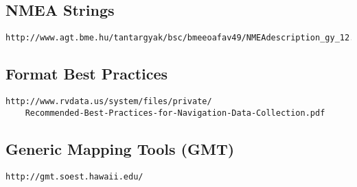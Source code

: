 \documentclass{article}
\begin{document}
		\subsection{NMEA Strings}
		\label{nmea_spec}
		
\begin{lstlisting}
http://www.agt.bme.hu/tantargyak/bsc/bmeeoafav49/NMEAdescription_gy_12.pdf
\end{lstlisting}
		
		\subsection{Format Best Practices}
		\label{best_practices}
		
\begin{lstlisting}
http://www.rvdata.us/system/files/private/
	Recommended-Best-Practices-for-Navigation-Data-Collection.pdf
\end{lstlisting}

		\subsection{Generic Mapping Tools (GMT)}
		\label{GMT}
		
\begin{lstlisting}
http://gmt.soest.hawaii.edu/
\end{lstlisting}

		
\end{document}
